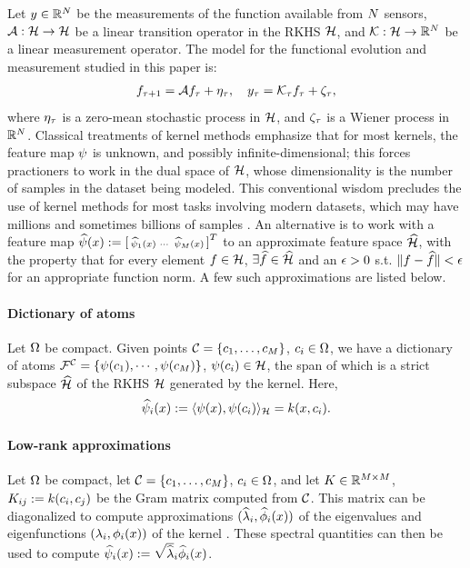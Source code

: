 Let $y\in\mathbb{R}^{N}$ be the measurements of the function available from $N$ sensors, $\mathcal{A}:\mathcal{H}\to\mathcal{H}$ be a linear transition operator in the RKHS $\mathcal{H}$, and $\mathcal{K}:\mathcal{H}\to\mathbb{R}^{N}$ be a linear measurement operator. The model for the functional evolution and measurement studied in this paper is:
\begin{align}\eqlabel{ideal_lin_evol}
 f_{\tindex+1} = \sysop f_{\tindex} + \eta_{\tindex}, \quad
 y_{\tindex} = \measop_{\tindex} f_{\tindex} + \zeta_{\tindex},
\end{align}
where $\eta_{\tau}$ is a zero-mean stochastic process in $\mathcal{H}$, and $\zeta_{\tau}$ is a Wiener process in $\mathbb{R}^{N}$. 
Classical treatments of kernel methods emphasize that for most kernels, the feature map $\psi$ is unknown, and possibly infinite-dimensional; this forces practioners to work in the dual space of $\mathcal{H}$, whose dimensionality is the number of samples in the dataset being modeled. This conventional wisdom precludes the use of kernel methods for most tasks involving modern datasets, which may have millions and sometimes billions of samples \cite{rahimi2007random}. An alternative is to work with a feature map 
$\widehat{\psi}(x) := \left[\begin{smallmatrix}
  \widehat{\psi}_1(x) & \cdots & \widehat{\psi}_{M}(x)
 \end{smallmatrix}\right]^T$ to an approximate feature space
 $\widehat{\mathcal{H}}$, with the property that for every element $f\in\mathcal{H}$, $\exists\widehat{f}\in\widehat{\mathcal{H}}$ and an $\epsilon >0$ s.t. $\|f-\widehat{f}\| < \epsilon$ for an appropriate function norm. A few such approximations are listed below.
\paragraph{Dictionary of atoms} Let $\Omega$ be compact. Given points $\mathcal{C} = \{c_1,\dots,c_{M}\}$, $c_i\in\Omega$, we have a dictionary of atoms $\mathcal{F}^{\mathcal{C}} = \{\psi(c_1), \cdots , \psi(c_{M})\}$, $\psi(c_i)\in\mathcal{H}$, the span of which is a strict subspace $\widehat{\mathcal{H}}$ of the RKHS $\mathcal{H}$ generated by the kernel. Here, 
 \begin{equation}\eqlabel{fmap_dict}
 \fmapApprox_i(x) := \l\fmap(x), \fmap(c_i)\r_{\fspace} = \kernel(x, c_i).
 \end{equation}
\paragraph{Low-rank approximations} Let $\Omega$ be compact, let $\mathcal{C} = \{c_1,\dots,c_{M}\}$, $c_i\in\Omega$, and let $K\in\mathbb{R}^{M\times M}$, $K_{ij}:=k(c_i,c_j)$ be the Gram matrix computed from $\mathcal{C}$. This matrix can be diagonalized to compute approximations $(\widehat {\lambda}_i, \widehat \phi_i(x))$ of the eigenvalues and eigenfunctions $(\lambda_i, \phi_i(x))$ of the kernel \cite{williams2001using2}. These spectral quantities can then be used to compute  $ \widehat{\psi}_i(x):=\sqrt{\widehat {\lambda}}_i\widehat \phi_i(x)$.
